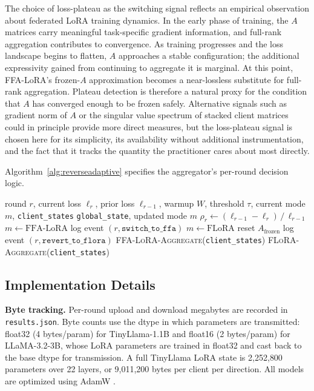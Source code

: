 The choice of loss-plateau as the switching signal reflects an empirical observation about federated LoRA training dynamics. In the early phase of training, the $A$ matrices carry meaningful task-specific gradient information, and full-rank aggregation contributes to convergence. As training progresses and the loss landscape begins to flatten, $A$ approaches a stable configuration; the additional expressivity gained from continuing to aggregate it is marginal. At this point, FFA-LoRA's frozen-$A$ approximation becomes a near-lossless substitute for full-rank aggregation. Plateau detection is therefore a natural proxy for the condition that $A$ has converged enough to be frozen safely. Alternative signals such as gradient norm of $A$ or the singular value spectrum of stacked client matrices could in principle provide more direct measures, but the loss-plateau signal is chosen here for its simplicity, its availability without additional instrumentation, and the fact that it tracks the quantity the practitioner cares about most directly.

Algorithm~\ref{alg:reverseadaptive} specifies the aggregator's per-round decision logic.

\begin{algorithm}[t]
\caption{ReverseAdaptive aggregator (per round)}
\label{alg:reverseadaptive}
\begin{algorithmic}[1]
\Require round $r$, current loss $\ell_r$, prior loss $\ell_{r-1}$,
         warmup $W$, threshold $\tau$, current mode $m$, \texttt{client\_states}
\Ensure \texttt{global\_state}, updated mode $m$
\State $\rho_r \leftarrow (\ell_{r-1} - \ell_r) \,/\, \ell_{r-1}$ 
    \State $m \leftarrow \text{FFA-LoRA}$
    \State log event $(r, \texttt{switch\_to\_ffa})$
 
    \State $m \leftarrow \text{FLoRA}$
    \State reset $A_{\text{frozen}}$
    \State log event $(r, \texttt{revert\_to\_flora})$
\EndIf
{}
    \State \Return \textsc{FFA-LoRA-Aggregate}(\texttt{client\_states})
\Else
    \State \Return \textsc{FLoRA-Aggregate}(\texttt{client\_states})
\EndIf
\end{algorithmic}
\end{algorithm}

\subsection{Implementation Details}
\label{sec:implementation}
\textbf{Byte tracking.}
Per-round upload and download megabytes are recorded in \texttt{results.json}. Byte counts use the dtype in which parameters are transmitted: float32 (4 bytes/param) for TinyLlama-1.1B and float16 (2 bytes/param) for LLaMA-3.2-3B, whose LoRA parameters are trained in float32 and cast back to the base dtype for transmission. A full TinyLlama LoRA state is 2{,}252{,}800 parameters over 22 layers, or 9{,}011{,}200 bytes per client per direction. All models are optimized using AdamW \citep{loshchilov2019decoupled}.

